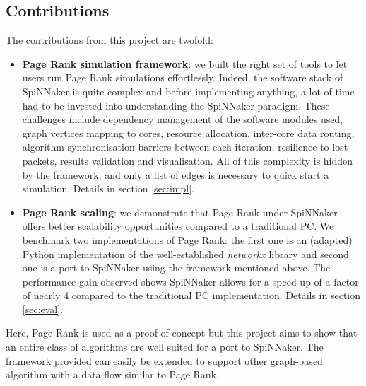 \subsection{Contributions}

The contributions from this project are twofold:

\begin{itemize}
\item \textbf{Page Rank simulation framework}: we built the right set of tools to let users run Page Rank simulations effortlessly. Indeed, the software stack of SpiNNaker is quite complex and before implementing anything, a lot of time had to be invested into understanding the SpiNNaker paradigm. These challenges include dependency management of the software modules used, graph vertices mapping to cores, resource allocation, inter-core data routing, algorithm synchronisation barriers between each iteration, resilience to lost packets, results validation and visualisation. All of this complexity is hidden by the framework, and only a list of edges is necessary to quick start a simulation. Details in section \ref{sec:impl}.

\item \textbf{Page Rank scaling}: we demonstrate that Page Rank under SpiNNaker offers better scalability opportunities compared to a traditional PC. We benchmark two implementations of Page Rank: the first one is an (adapted) Python implementation of the well-established \textit{networkx} \cite{networkx} library and second one is a port to SpiNNaker using the framework mentioned above. The performance gain observed shows SpiNNaker allows for a speed-up of a factor of nearly 4 compared to the traditional PC implementation. Details in section \ref{sec:eval}.
\end{itemize}


Here, Page Rank is used as a proof-of-concept but this project aims to show that an entire class of algorithms are well suited for a port to SpiNNaker. The framework provided can easily be extended to support other graph-based algorithm with a data flow similar to Page Rank.




